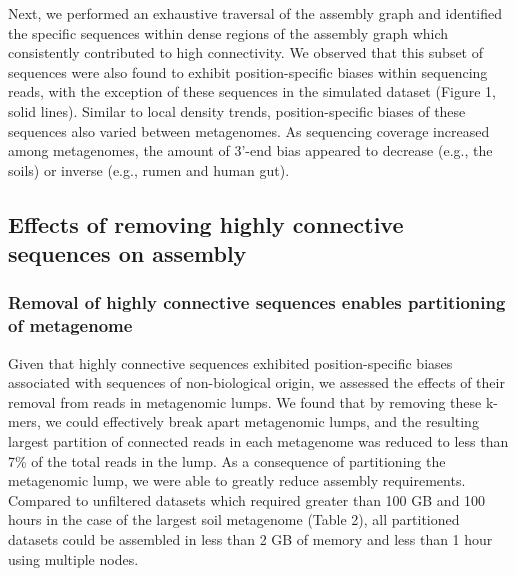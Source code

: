 \documentclass[10pt]{article}
\begin{document}
Next, we performed an exhaustive traversal of the assembly graph and identified the specific sequences within dense regions of the assembly graph which consistently contributed to high connectivity.  We observed that this subset of sequences were also found to exhibit position-specific biases within sequencing reads, with the exception of these sequences in the simulated dataset (Figure 1, solid lines).  Similar to local density trends, position-specific biases of these sequences also varied between metagenomes.  As sequencing coverage increased among metagenomes, the amount of 3'-end bias appeared to decrease (e.g., the soils) or inverse (e.g., rumen and human gut).

\subsection*{Effects of removing highly connective sequences on assembly}

\subsubsection*{Removal of highly connective sequences enables partitioning of metagenome}
Given that highly connective sequences exhibited position-specific biases associated with sequences of non-biological origin, we assessed the effects of their removal from reads in metagenomic lumps.  We found that by removing these k-mers, we could effectively break apart metagenomic lumps, and the resulting largest partition of connected reads in each metagenome was reduced to less than 7\% of the total reads in the lump.  As a consequence of partitioning the metagenomic lump, we were able to greatly reduce assembly requirements.  Compared to unfiltered datasets which required greater than 100 GB and 100 hours in the case of the largest soil metagenome (Table 2), all partitioned datasets could be assembled in less than 2 GB of memory and less than 1 hour using multiple nodes. 
\end{document}
